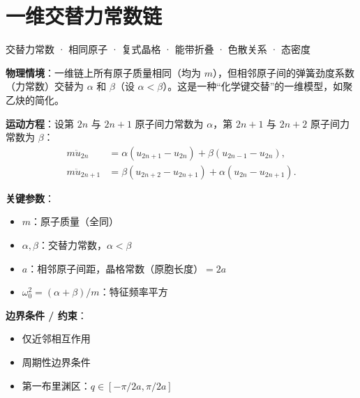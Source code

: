 
\section{一维交替力常数链}
\label{sec:1d-alternating-spring}

\begin{tipbox}[关键词标签]
交替力常数 · 相同原子 · 复式晶格 · 能带折叠 · 色散关系 · 态密度
\end{tipbox}

\begin{modelbox}[模型：一维交替力常数链]
\textbf{物理情境}：一维链上所有原子质量相同（均为 $m$），但相邻原子间的弹簧劲度系数（力常数）交替为 $\alpha$ 和 $\beta$（设 $\alpha<\beta$）。这是一种``化学键交替''的一维模型，如聚乙炔的简化。

\textbf{运动方程}：设第 $2n$ 与 $2n+1$ 原子间力常数为 $\alpha$，第 $2n+1$ 与 $2n+2$ 原子间力常数为 $\beta$：
\begin{align*}
m\ddot{u}_{2n} &= \alpha(u_{2n+1}-u_{2n})+\beta(u_{2n-1}-u_{2n}),\\
m\ddot{u}_{2n+1} &= \beta(u_{2n+2}-u_{2n+1})+\alpha(u_{2n}-u_{2n+1}).
\end{align*}

\textbf{关键参数}：
\begin{itemize}[nosep]
    \item $m$：原子质量（全同）
    \item $\alpha, \beta$：交替力常数，$\alpha<\beta$
    \item $a$：相邻原子间距，晶格常数（原胞长度）$=2a$
    \item $\omega_0^2=(\alpha+\beta)/m$：特征频率平方
\end{itemize}

\textbf{边界条件 / 约束}：
\begin{itemize}[nosep]
    \item 仅近邻相互作用
    \item 周期性边界条件
    \item 第一布里渊区：$q\in[-\pi/2a, \pi/2a]$
\end{itemize}
\end{modelbox}

